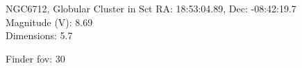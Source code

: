 \begin{block}{NGC6712, Globular Cluster in Sct}
    RA: 18:53:04.89, Dec: -08:42:19.7 \\ 
    Magnitude (V): 8.69 \\ 
    Dimensions: 5.7 

    Finder fov: 30 
\end{block}